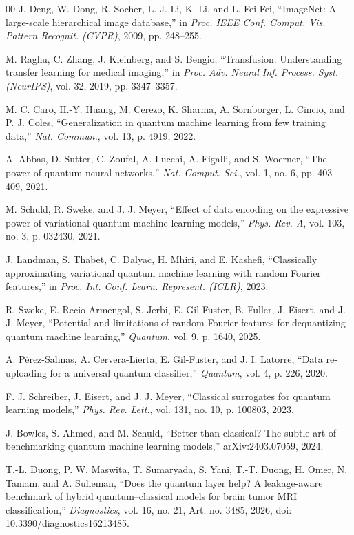 \documentclass{ieeeaccess}
\begin{document}
\begin{thebibliography}{00}
 J. Deng, W. Dong, R. Socher, L.-J. Li, K. Li, and L. Fei-Fei, ``ImageNet: A large-scale hierarchical image database,'' in \emph{Proc. IEEE Conf. Comput. Vis. Pattern Recognit. (CVPR)}, 2009, pp. 248--255.

 M. Raghu, C. Zhang, J. Kleinberg, and S. Bengio, ``Transfusion: Understanding transfer learning for medical imaging,'' in \emph{Proc. Adv. Neural Inf. Process. Syst. (NeurIPS)}, vol. 32, 2019, pp. 3347--3357.

 M. C. Caro, H.-Y. Huang, M. Cerezo, K. Sharma, A. Sornborger, L. Cincio, and P. J. Coles, ``Generalization in quantum machine learning from few training data,'' \emph{Nat. Commun.}, vol. 13, p. 4919, 2022.

 A. Abbas, D. Sutter, C. Zoufal, A. Lucchi, A. Figalli, and S. Woerner, ``The power of quantum neural networks,'' \emph{Nat. Comput. Sci.}, vol. 1, no. 6, pp. 403--409, 2021.

 M. Schuld, R. Sweke, and J. J. Meyer, ``Effect of data encoding on the expressive power of variational quantum-machine-learning models,'' \emph{Phys. Rev. A}, vol. 103, no. 3, p. 032430, 2021.

 J. Landman, S. Thabet, C. Dalyac, H. Mhiri, and E. Kashefi, ``Classically approximating variational quantum machine learning with random Fourier features,'' in \emph{Proc. Int. Conf. Learn. Represent. (ICLR)}, 2023.

 R. Sweke, E. Recio-Armengol, S. Jerbi, E. Gil-Fuster, B. Fuller, J. Eisert, and J. J. Meyer, ``Potential and limitations of random Fourier features for dequantizing quantum machine learning,'' \emph{Quantum}, vol. 9, p. 1640, 2025.

 A. P\'erez-Salinas, A. Cervera-Lierta, E. Gil-Fuster, and J. I. Latorre, ``Data re-uploading for a universal quantum classifier,'' \emph{Quantum}, vol. 4, p. 226, 2020.

 F. J. Schreiber, J. Eisert, and J. J. Meyer, ``Classical surrogates for quantum learning models,'' \emph{Phys. Rev. Lett.}, vol. 131, no. 10, p. 100803, 2023.

 J. Bowles, S. Ahmed, and M. Schuld, ``Better than classical? The subtle art of benchmarking quantum machine learning models,'' arXiv:2403.07059, 2024.

 T.-L. Duong, P. W. Maswita, T. Sumaryada, S. Yani, T.-T. Duong, H. Omer, N. Tamam, and A. Sulieman, ``Does the quantum layer help? A leakage-aware benchmark of hybrid quantum--classical models for brain tumor MRI classification,'' \emph{Diagnostics}, vol. 16, no. 21, Art. no. 3485, 2026, doi: 10.3390/diagnostics16213485.


\end{thebibliography}
\end{document}

